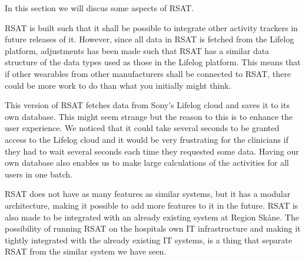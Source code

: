 \documentclass{cslthse-msc}
\begin{document}
In this section we will discus some aspects of RSAT. 

RSAT is built such that it shall be possible to integrate other activity trackers in future releases of it. However, since all data in RSAT is fetched from the Lifelog platform, adjustments has been made such that RSAT has a similar data structure of the data types used as those in the Lifelog platform. This means that if other wearables from other manufacturers shall be connected to RSAT, there could be more work to do than what you initially might think. 

This version of RSAT fetches data from Sony’s Lifelog cloud and saves it to its own database. This might seem strange but the reason to this is to enhance the user experience. We noticed that it could take several seconds to be granted access to the Lifelog cloud and it would be very frustrating for the clinicians if they had to wait several seconds each time they requested some data. Having our own database also enables us to make large calculations of the activities for all users in one batch.  

RSAT does not have as many features as similar systems, but it has a modular architecture, making it possible to add more features to it in the future. RSAT is also made to be integrated with an already existing system at Region Skåne. The possibility of running RSAT on the hospitals own IT infrastructure and making it tightly integrated with the already existing IT systems, is a thing that separate RSAT from the similar system we have seen. 



\end{document}
